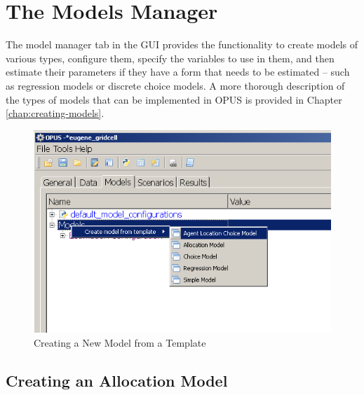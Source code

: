 \chapter{The Models Manager}

The model manager tab in the GUI provides the functionality to create models of various types, configure them, specify the variables to use in them, and then estimate their parameters if they have a form that needs to be estimated -- such as regression models or discrete choice models.  A more thorough description of the types of models that can be implemented in OPUS is provided in Chapter \ref{chap:creating-models}.

\begin{figure}[htp]
\begin{center}
\includegraphics[scale=0.6]{part-gui/images/model-manager-create-model-from-template.png}
\end{center}
\caption{Creating a New Model from a Template}
\label{fig:create-model}
\end{figure}

\section{Creating an Allocation Model}

